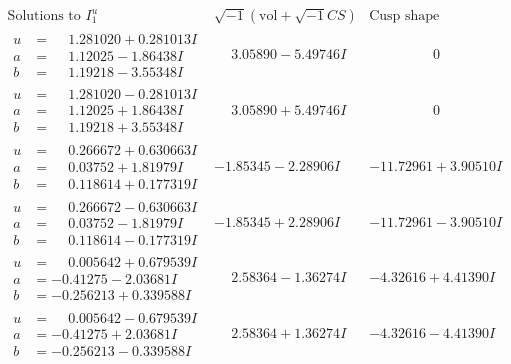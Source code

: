 \documentclass[1p]{elsarticle_modified}
\theoremstyle{definition}
\newcommand{\I}{\sqrt{-1}}
\begin{document}
$$\begin{array}{c|c|c}
\text{Solutions to }I^u_{1}& \I (\text{vol} + \sqrt{-1}CS) & \text{Cusp shape}\\
 \hline 
\begin{aligned}
u &= \phantom{-}1.281020 + 0.281013 I \\
a &= \phantom{-}1.12025 - 1.86438 I \\
b &= \phantom{-}1.19218 - 3.55348 I\end{aligned}
 & \phantom{-}3.05890 - 5.49746 I & \phantom{-0.000000 } 0 \\ \hline\begin{aligned}
u &= \phantom{-}1.281020 - 0.281013 I \\
a &= \phantom{-}1.12025 + 1.86438 I \\
b &= \phantom{-}1.19218 + 3.55348 I\end{aligned}
 & \phantom{-}3.05890 + 5.49746 I & \phantom{-0.000000 } 0 \\ \hline\begin{aligned}
u &= \phantom{-}0.266672 + 0.630663 I \\
a &= \phantom{-}0.03752 + 1.81979 I \\
b &= \phantom{-}0.118614 + 0.177319 I\end{aligned}
 & -1.85345 - 2.28906 I & -11.72961 + 3.90510 I \\ \hline\begin{aligned}
u &= \phantom{-}0.266672 - 0.630663 I \\
a &= \phantom{-}0.03752 - 1.81979 I \\
b &= \phantom{-}0.118614 - 0.177319 I\end{aligned}
 & -1.85345 + 2.28906 I & -11.72961 - 3.90510 I \\ \hline\begin{aligned}
u &= \phantom{-}0.005642 + 0.679539 I \\
a &= -0.41275 - 2.03681 I \\
b &= -0.256213 + 0.339588 I\end{aligned}
 & \phantom{-}2.58364 - 1.36274 I & -4.32616 + 4.41390 I \\ \hline\begin{aligned}
u &= \phantom{-}0.005642 - 0.679539 I \\
a &= -0.41275 + 2.03681 I \\
b &= -0.256213 - 0.339588 I\end{aligned}
 & \phantom{-}2.58364 + 1.36274 I & -4.32616 - 4.41390 I \\ \hline\begin{aligned}

\end{aligned}
\end{array}$$
\end{document}
